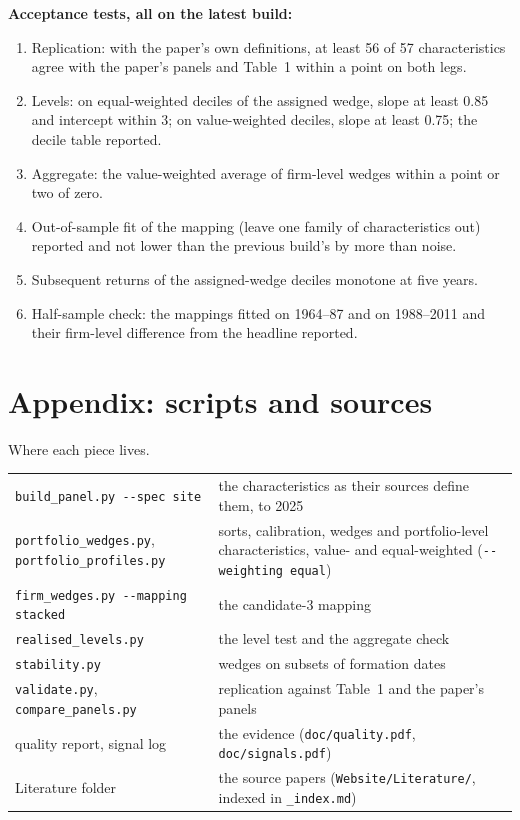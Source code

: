 \documentclass[11pt]{article}
\begin{document}
\textbf{Acceptance tests, all on the latest build:}
\begin{enumerate}[nosep,leftmargin=*]
\item Replication: with the paper's own definitions, at least 56 of 57
characteristics agree with the paper's panels and Table~1 within a point on
both legs.
\item Levels: on equal-weighted deciles of the assigned wedge, slope at
least 0.85 and intercept within 3\pp; on value-weighted deciles, slope at
least 0.75; the decile table reported.
\item Aggregate: the value-weighted average of firm-level wedges within a
point or two of zero.
\item Out-of-sample fit of the mapping (leave one family of characteristics
out) reported and not lower than the previous build's by more than noise.
\item Subsequent returns of the assigned-wedge deciles monotone at five
years.
\item Half-sample check: the mappings fitted on 1964--87 and on 1988--2011
and their firm-level difference from the headline reported.
\end{enumerate}

\section*{Appendix: scripts and sources}

\begin{tbl}{Where each piece lives.}
\begin{tabular}{p{5.6cm}p{8.6cm}}\toprule
\texttt{build\_panel.py -{}-spec site} & the characteristics as their sources define them, to 2025\\
\texttt{portfolio\_wedges.py}, \texttt{portfolio\_profiles.py} & sorts, calibration, wedges and portfolio-level characteristics, value- and equal-weighted (\texttt{-{}-weighting equal})\\
\texttt{firm\_wedges.py -{}-mapping stacked} & the candidate-3 mapping\\
\texttt{realised\_levels.py} & the level test and the aggregate check\\
\texttt{stability.py} & wedges on subsets of formation dates\\
\texttt{validate.py}, \texttt{compare\_panels.py} & replication against Table~1 and the paper's panels\\
quality report, signal log & the evidence (\texttt{doc/quality.pdf}, \texttt{doc/signals.pdf})\\
Literature folder & the source papers (\texttt{Website/Literature/}, indexed in \texttt{\_index.md})\\
\bottomrule
\end{tabular}
\end{tbl}
\end{document}
